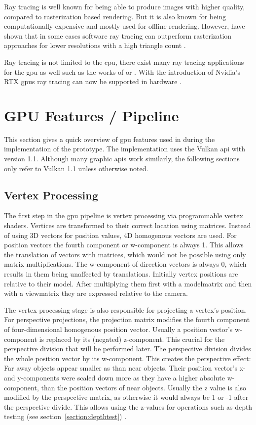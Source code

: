 Ray tracing is well known for being able to produce images with higher quality, compared to rasterization based rendering. But it is also known for being computationally expensive and mostly used for offline rendering. However, \textcite{wald:2001:interactive} have shown that in some cases software ray tracing can outperform rasterization approaches for lower resolutions with a high triangle count \cite{wald:2001:interactive}.

Ray tracing is not limited to the \gls{cpu}, there exist many ray tracing applications for the \gls{gpu} as well such as the works of \textcite{foley:2005:kd} or \textcite{parker:2010:optix}. With the introduction of Nvidia's RTX \glspl{gpu} ray tracing can now be supported in hardware \cite{raytracinggems}.


\section{GPU Features / Pipeline}

This section gives a quick overview of \gls{gpu} features used in during the implementation of the prototype. The implementation uses the Vulkan \gls{api} with version 1.1. Although many graphic \glspl{api} work similarly, the following sections only refer to Vulkan 1.1 unless otherwise noted.


\subsection{Vertex Processing}
The first step in the \gls{gpu} pipeline is vertex processing via programmable vertex shaders. Vertices are transformed to their correct location using matrices. Instead of using 3D vectors for position values, 4D homogenous vectors are used. For position vectors the fourth component or w-component is always 1. This allows the translation of vectors with matrices, which would not be possible using only matrix multiplications. The w-component of direction vectors is always 0, which results in them being unaffected by translations. Initially vertex positions are relative to their model. After multiplying them first with a \gls{modelmatrix} and then with a \gls{viewmatrix} they are expressed relative to the camera.

The vertex processing stage is also responsible for projecting a vertex's position. For perspective projections, the projection matrix modifies the fourth component of four-dimensional homogenous position vector. Usually a position vector's w-component is replaced by its (negated) z-component. This crucial for the perspective division that will be performed later. The perspective division divides the whole position vector by its w-component. This creates the perspective effect: Far away objects appear smaller as than near objects. Their position vector's x- and y-components were scaled down more as they have a higher absolute w-component, than the position vectors of near objects. Usually the z value is also modified by the perspective matrix, as otherwise it would always be 1 or -1 after the perspective divide. This allows using the z-values for operations such as depth testing (see section~\ref{section:depthtest}) \cite{akine:2018:realtime}.

